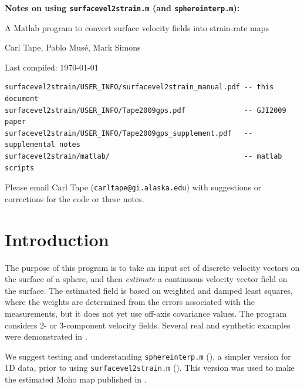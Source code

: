 \documentclass[11pt,titlepage,fleqn]{article}
\begin{document}

\begin{spacing}{1.5}
\begin{center}
{\large \bf Notes on using {\tt surfacevel2strain.m} (and {\tt sphereinterp.m}):

A Matlab program to convert surface velocity fields into strain-rate maps}
\end{center}
\end{spacing}

\bigskip
\noindent Carl Tape, Pablo Mus\'e, Mark Simons

\noindent Last compiled: \today

\small

\begin{verbatim}
surfacevel2strain/USER_INFO/surfacevel2strain_manual.pdf -- this document
surfacevel2strain/USER_INFO/Tape2009gps.pdf              -- GJI2009 paper
surfacevel2strain/USER_INFO/Tape2009gps_supplement.pdf   -- supplemental notes
surfacevel2strain/matlab/                                -- matlab scripts
\end{verbatim}

\noindent
Please email Carl Tape ({\tt carltape@gi.alaska.edu}) with suggestions or corrections for the code or these notes.

\tableofcontents


\section{Introduction}

The purpose of this program is to take an input set of discrete velocity vectors on the surface of a sphere, and then {\em estimate} a continuous velocity vector field on the surface. The estimated field is based on weighted and damped least squares, where the weights are determined from the errors associated with the measurements, but it does not yet use off-axis covariance values.  The program considers 2- or 3-component velocity fields. Several real and synthetic examples were demonstrated in \citet{Tape2009gps}.

We suggest testing and understanding \verb+sphereinterp.m+ (), a simpler version for 1D data, prior to using \verb+surfacevel2strain.m+ (). This version was used to make the estimated Moho map published in \citet{Tape2012moho}.
\end{document}
